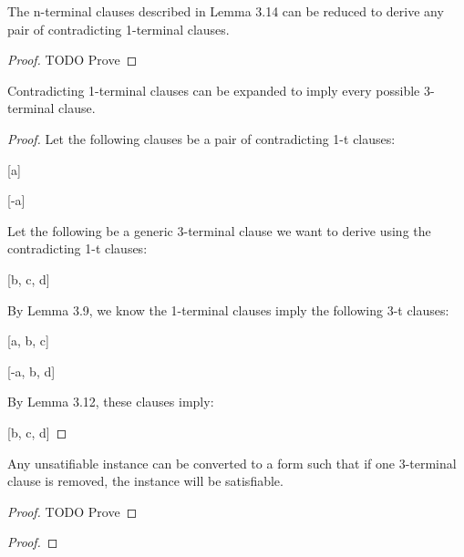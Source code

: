 \documentclass[manuscript]{acmart}
\begin{document}
    \begin{lemma}
        The n-terminal clauses described in Lemma 3.14 can be reduced to derive
        any pair of contradicting 1-terminal clauses.
    \end{lemma}
    \begin{proof}
        TODO Prove
    \end{proof}

    \begin{lemma}
        Contradicting 1-terminal clauses can be expanded to imply
        every possible 3-terminal clause.
    \end{lemma}
    \begin{proof}
        Let the following clauses be a pair of contradicting 1-t clauses:

        [a]

        [-a]

        Let the following be a generic 3-terminal clause we want to derive
        using the contradicting 1-t clauses:

        [b, c, d]

        By Lemma 3.9, we know the 1-terminal clauses imply the following 3-t clauses:

        [a, b, c]

        [-a, b, d]

        By Lemma 3.12, these clauses imply:

        [b, c, d]
    \end{proof}

    \begin{lemma}
        Any unsatifiable instance can be converted to a form such that if one 3-terminal
        clause is removed, the instance will be satisfiable.
    \end{lemma}
    \begin{proof}
        TODO Prove    
    \end{proof}

    \begin{lemma}
        
    \end{lemma}
    \begin{proof}
        
    \end{proof}
\end{document}
